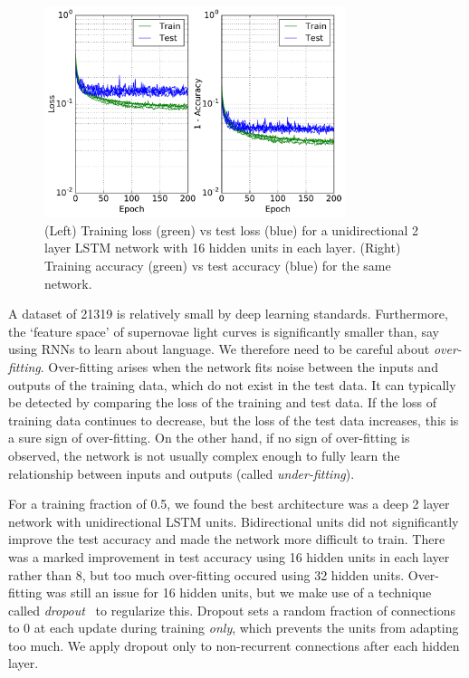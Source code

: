 \documentclass[nofootinbib,amsmath,amssymb,10pt,eqsecnum, twocolumn]{revtex4-1}
\begin{document}
\begin{figure}
\centering
\includegraphics[width=88mm, angle=0]{lstm_dropout_05_loss.pdf}
\caption{\label{fig:loss} (Left) Training loss (green) vs test loss (blue) for a unidirectional 2 layer  LSTM network with 16 hidden units in each layer. (Right) Training accuracy (green) vs test accuracy (blue) for the same network.  }
\end{figure}

A dataset of 21319 is relatively small by deep learning standards. Furthermore, the `feature space' of supernovae light curves is significantly smaller than, say using RNNs to learn about language. We therefore need to be careful about {\em over-fitting}. Over-fitting arises when the network fits noise between the inputs and outputs of the training data, which do not exist in the test data. It can typically be detected by comparing the loss of the training and test data. If the loss of training data continues to decrease, but the loss of the test data increases, this is a sure sign of over-fitting. On the other hand, if no sign of over-fitting is observed, the network is not usually complex enough to fully learn the relationship between inputs and outputs (called {\em under-fitting}).  

For a training fraction of 0.5, we found the best architecture was a deep 2 layer network with unidirectional LSTM units. Bidirectional units did not significantly improve the test accuracy and made the network more difficult to train. There was a marked improvement in test accuracy using 16 hidden units in each layer rather than 8, but too much over-fitting occured using 32 hidden units. Over-fitting was still an issue for 16 hidden units,  but we make use of a technique called {\em dropout}~\cite{JMLR:v15:srivastava14a} to regularize this. Dropout  sets a random fraction of connections to 0 at each update during training {\em only}, which prevents the units from adapting too much. We apply dropout only to non-recurrent connections after each hidden layer. 
\end{document}
